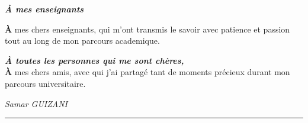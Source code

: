 \documentclass[12pt, oneside, a4paper]{report}
\begin{document}
\begin{center}
\textit{\textbf{À mes enseignants}}


{\Huge\textbf{À}} mes chers enseignants, qui m'ont transmis le savoir avec patience et passion tout au long de mon parcours academique.


\end{center}

\begin{center}
\textit{\textbf{À toutes les personnes qui me sont chères,}}\\

{\Huge\textbf{À}} mes chers amis, avec qui j'ai partagé tant de moments précieux durant mon parcours universitaire. 



\end{center}

\vspace{1cm}

\begin{flushright}
\textit{Samar GUIZANI}

\end{flushright}
\clearpage
\thispagestyle{plain}

\noindent\rule[-0.2cm]{0.45cm}{1.2cm}\hspace{0.15cm}%
\raisebox{0.85cm}{\rule{0.85\textwidth}{0.5pt}}\\[0.3cm]
\noindent{}\\[1.5cm]
\end{document}
